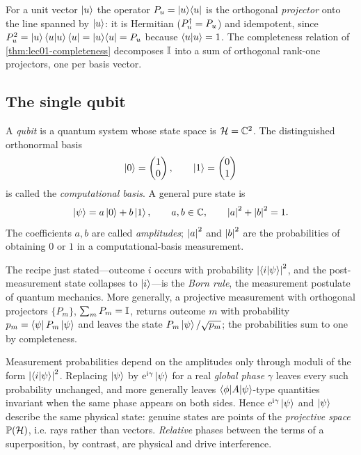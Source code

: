 \begin{remark}[Projectors]
For a unit vector $\ket{u}$ the operator $P_u=\ket{u}\!\bra{u}$ is the orthogonal
\emph{projector} onto the line spanned by $\ket{u}$: it is Hermitian
($P_u^{\dagger}=P_u$) and idempotent, since $P_u^{2}=\ket{u}\braket{u|u}\bra{u}=\ket{u}\!\bra{u}=P_u$
because $\braket{u|u}=1$. The completeness relation of
\cref{thm:lec01-completeness} decomposes $\mathbb{I}$ into a sum of orthogonal rank-one
projectors, one per basis vector.
\end{remark}

\subsection{The single qubit}

\begin{definition}\label{def:lec01-qubit}
A \emph{qubit} is a quantum system whose state space is $\mathcal{H}=\mathbb{C}^{2}$. The
distinguished orthonormal basis
\[
  \ket{0}=\begin{pmatrix}1\\0\end{pmatrix},\qquad
  \ket{1}=\begin{pmatrix}0\\1\end{pmatrix}
\]
is called the \emph{computational basis}. A general pure state is
\begin{equation}\label{eq:lec01-qubit}
  \ket{\psi}=a\ket{0}+b\ket{1},\qquad a,b\in\mathbb{C},\qquad \left\lvert a \right\rvert^{2}+\left\lvert b \right\rvert^{2}=1 .
\end{equation}
The coefficients $a,b$ are called \emph{amplitudes}; $\left\lvert a \right\rvert^{2}$ and $\left\lvert b \right\rvert^{2}$
are the probabilities of obtaining $0$ or $1$ in a computational-basis measurement.
\end{definition}

The recipe just stated---outcome $i$ occurs with probability $\left\lvert \braket{i|\psi} \right\rvert^{2}$,
and the post-measurement state collapses to $\ket{i}$---is the \emph{Born rule},
the measurement postulate of quantum mechanics. More generally, a projective
measurement with orthogonal projectors $\{P_m\}$, $\sum_m P_m=\mathbb{I}$, returns outcome
$m$ with probability $p_m=\bra{\psi}P_m\ket{\psi}$ and leaves the state
$P_m\ket{\psi}/\sqrt{p_m}$; the probabilities sum to one by completeness.

\begin{remark}\label{rem:lec01-global}
Measurement probabilities depend on the amplitudes only through moduli of the form
$\left\lvert \braket{i|\psi} \right\rvert^{2}$. Replacing $\ket{\psi}$ by $\mathrm{e}^{\mathrm{i}\gamma}\ket{\psi}$ for a
real \emph{global phase} $\gamma$ leaves every such probability unchanged, and more
generally leaves $\braket{\phi|A|\psi}$-type quantities invariant when the same
phase appears on both sides. Hence $\mathrm{e}^{\mathrm{i}\gamma}\ket{\psi}$ and $\ket{\psi}$ describe
the same physical state: genuine states are points of the \emph{projective space}
$\mathbb{P}(\mathcal{H})$, i.e. rays rather than vectors. \emph{Relative} phases between the
terms of a superposition, by contrast, are physical and drive interference.
\end{remark}


